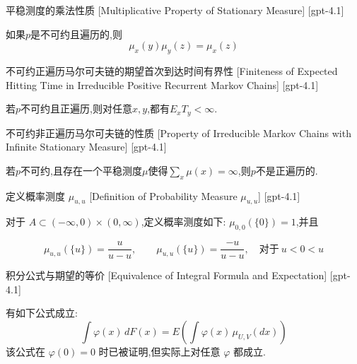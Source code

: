 \documentclass[UTF8]{ctexart}
\begin{document}
    
    
    \begin{thm}
        {平稳测度的乘法性质}
        [Multiplicative Property of Stationary Measure]
        [gpt-4.1]
        
如果$p$是不可约且遍历的,则
\[
\mu _ { x } ( y ) \mu _ { y } ( z ) = \mu _ { x } ( z )
\]

    \end{thm}
    
    
    
    \begin{thm}
        {不可约正遍历马尔可夫链的期望首次到达时间有界性}
        [Finiteness of Expected Hitting Time in Irreducible Positive Recurrent Markov Chains]
        [gpt-4.1]
        
若$p$不可约且正遍历,则对任意$x, y$,都有$E _ { x } T _ { y } < \infty$.

    \end{thm}
    
    
    
    \begin{thm}
        {不可约非正遍历马尔可夫链的性质}
        [Property of Irreducible Markov Chains with Infinite Stationary Measure]
        [gpt-4.1]
        
若$p$不可约,且存在一个平稳测度$\mu$使得$\sum _ { x } \mu ( x ) = \infty$,则$p$不是正遍历的.

    \end{thm}
    
    
    
    \begin{dfn}
        {定义概率测度 $\mu_{u,
    u}$}
        [Definition of Probability Measure $\mu_{u,
    u}$]
        [gpt-4.1]
        
对于 $A \subset ( -\infty, 0 ) \times ( 0, \infty )$,定义概率测度如下:
$\mu_{0,0} ( \{ 0 \} ) = 1$,并且

\[
\mu_{u,
u}( \{ u \} ) = \frac{ 
u }{ 
u - u }, \qquad \mu_{u,
u}( \{ 
u \} ) = \frac{ -u }{ 
u - u }, \quad \text{对于}\ u < 0 < 
u
\]

    \end{dfn}
    
    
    
    \begin{thm}
        {积分公式与期望的等价}
        [Equivalence of Integral Formula and Expectation]
        [gpt-4.1]
        
有如下公式成立:
\[
\int \varphi(x)\, dF(x) = E\left( \int \varphi(x)\, \mu_{U,V}(dx) \right)
\]
该公式在 $\varphi(0) = 0$ 时已被证明,但实际上对任意 $\varphi$ 都成立.

    \end{thm}
    
\end{document}
